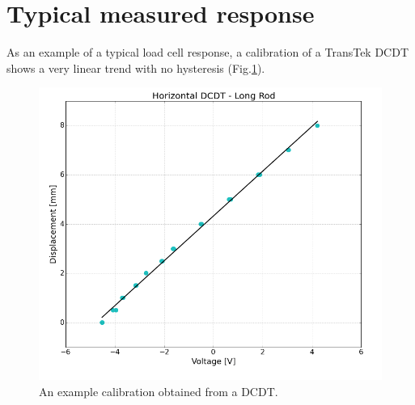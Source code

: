 \section{Typical measured response}

As an example of a typical load cell response, a calibration of a TransTek DCDT shows a very linear trend with no hysteresis (Fig.\ref{ex_dcdt_fit}).

\begin{figure}
	\centering
		\includegraphics[scale=0.35]{appendix_dcdt_calibration/ex_dcdt_fit.png}
   	\caption{An example calibration obtained from a DCDT. }
  	\label{ex_dcdt_fit}
\end{figure}

